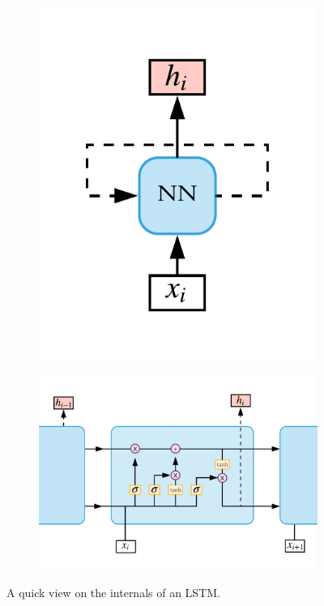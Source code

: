 \begin{figure}[ht]
	\centering
	\begin{subfigure}[t]{0.25\textwidth}
		\includegraphics[width=\linewidth]{imgs/rnn.pdf}
		\label{fig:rnn:generic}
	\end{subfigure}%
	\begin{subfigure}[t]{0.60\textwidth}
		\includegraphics[width=\linewidth]{imgs/lstm_cell.pdf}
		\label{fig:rnn:lstm}
	\end{subfigure}%
	\caption{A quick view on the internals of an LSTM.}
	\label{fig:rnn}
\end{figure}

